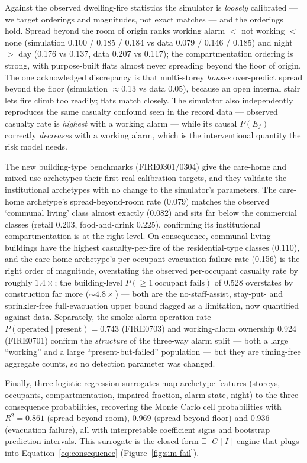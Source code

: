 Against the observed dwelling-fire statistics the simulator is \emph{loosely}
calibrated --- we target orderings and magnitudes, not exact matches --- and the
orderings hold. Spread beyond the room of origin ranks working alarm $<$ not
working $<$ none (simulation 0.100 / 0.185 / 0.184 vs data 0.079 / 0.146 / 0.185)
and night $>$ day (0.176 vs 0.137, data 0.207 vs 0.117); the compartmentation
ordering is strong, with purpose-built flats almost never spreading beyond the
floor of origin. The one acknowledged discrepancy is that multi-storey
\emph{houses} over-predict spread beyond the floor (simulation $\approx$0.13 vs
data 0.05), because an open internal stair lets fire climb too readily; flats match
closely. The simulator also independently reproduces the same casualty confound
seen in the record data --- observed casualty rate is \emph{highest} with a working
alarm --- while its causal $P(E_f)$ correctly \emph{decreases} with a working
alarm, which is the interventional quantity the risk model needs.

The new building-type benchmarks (FIRE0301/0304) give the care-home and mixed-use
archetypes their first real calibration targets, and they validate the
institutional archetypes with no change to the simulator's parameters. The
care-home archetype's spread-beyond-room rate (0.079) matches the observed
`communal living' class almost exactly (0.082) and sits far below the commercial
classes (retail 0.203, food-and-drink 0.225), confirming its institutional
compartmentation is at the right level. On consequence, communal-living buildings
have the highest casualty-per-fire of the residential-type classes (0.110), and the
care-home archetype's per-occupant evacuation-failure rate (0.156) is the right
order of magnitude, overstating the observed per-occupant casualty rate by roughly
$1.4\times$; the building-level $P(\geq 1\ \text{occupant fails})$ of 0.528
overstates by construction far more ($\sim$$4.8\times$) --- both are the
no-staff-assist, stay-put- and sprinkler-free full-evacuation upper bound flagged
as a limitation, now quantified against data. Separately, the smoke-alarm operation rate
$P(\text{operated}\mid\text{present}) = 0.743$ (FIRE0703) and working-alarm
ownership 0.924 (FIRE0701) confirm the \emph{structure} of the three-way alarm
split --- both a large ``working'' and a large ``present-but-failed'' population ---
but they are timing-free aggregate counts, so no detection parameter was changed.

Finally, three logistic-regression surrogates map archetype features (storeys,
occupants, compartmentation, impaired fraction, alarm state, night) to the three
consequence probabilities, recovering the Monte Carlo cell probabilities with
$R^2 = 0.861$ (spread beyond room), $0.969$ (spread beyond floor) and $0.936$
(evacuation failure), all with interpretable coefficient signs and bootstrap
prediction intervals. This surrogate is the closed-form $\mathbb{E}[C\mid I]$
engine that plugs into Equation~\eqref{eq:consequence}
(Figure~\ref{fig:sim-fail}).

